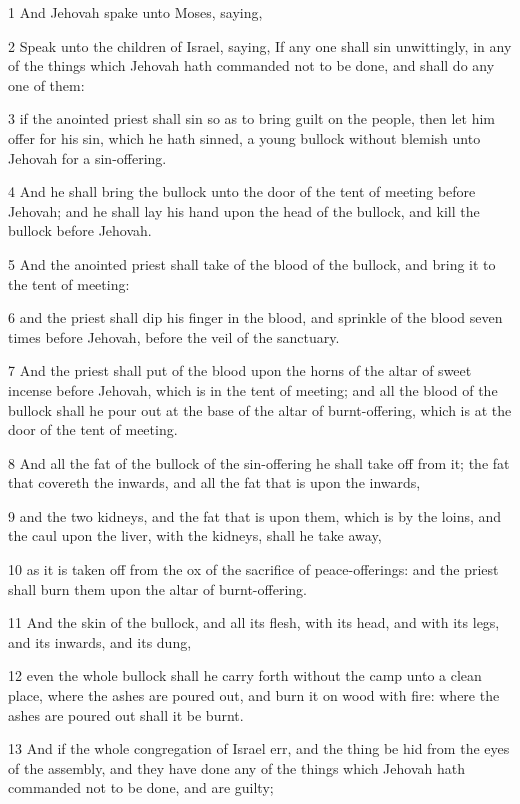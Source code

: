 \par 1 And Jehovah spake unto Moses, saying,
\par 2 Speak unto the children of Israel, saying, If any one shall sin unwittingly, in any of the things which Jehovah hath commanded not to be done, and shall do any one of them:
\par 3 if the anointed priest shall sin so as to bring guilt on the people, then let him offer for his sin, which he hath sinned, a young bullock without blemish unto Jehovah for a sin-offering.
\par 4 And he shall bring the bullock unto the door of the tent of meeting before Jehovah; and he shall lay his hand upon the head of the bullock, and kill the bullock before Jehovah.
\par 5 And the anointed priest shall take of the blood of the bullock, and bring it to the tent of meeting:
\par 6 and the priest shall dip his finger in the blood, and sprinkle of the blood seven times before Jehovah, before the veil of the sanctuary.
\par 7 And the priest shall put of the blood upon the horns of the altar of sweet incense before Jehovah, which is in the tent of meeting; and all the blood of the bullock shall he pour out at the base of the altar of burnt-offering, which is at the door of the tent of meeting.
\par 8 And all the fat of the bullock of the sin-offering he shall take off from it; the fat that covereth the inwards, and all the fat that is upon the inwards,
\par 9 and the two kidneys, and the fat that is upon them, which is by the loins, and the caul upon the liver, with the kidneys, shall he take away,
\par 10 as it is taken off from the ox of the sacrifice of peace-offerings: and the priest shall burn them upon the altar of burnt-offering.
\par 11 And the skin of the bullock, and all its flesh, with its head, and with its legs, and its inwards, and its dung,
\par 12 even the whole bullock shall he carry forth without the camp unto a clean place, where the ashes are poured out, and burn it on wood with fire: where the ashes are poured out shall it be burnt.
\par 13 And if the whole congregation of Israel err, and the thing be hid from the eyes of the assembly, and they have done any of the things which Jehovah hath commanded not to be done, and are guilty;
